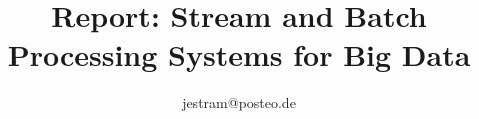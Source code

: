\documentclass[conference]{IEEEtran}
\begin{document}
\title{Report: Stream and Batch Processing Systems for Big Data\\}

\author{
jestram@posteo.de}

\maketitle





 





\end{document}
